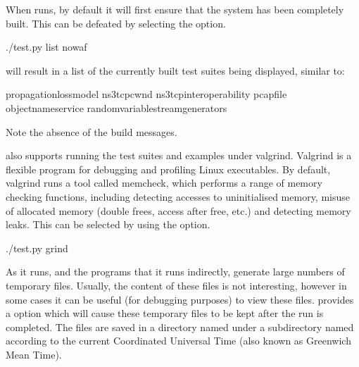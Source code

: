 \documentclass[letterpaper,10pt,english]{sphinxmanual}
\renewcommand{\sphinxcode}[1]{\texttt{\small{#1}}}
\begin{document}
When \sphinxcode{} runs, by default it will first ensure that the system has
been completely built.  This can be defeated by selecting the \sphinxcode{}
option.

\begin{sphinxVerbatim}[commandchars=\\\{\}]
\PYGZdl{} ./test.py \PYGZhy{}\PYGZhy{}list \PYGZhy{}\PYGZhy{}nowaf
\end{sphinxVerbatim}

will result in a list of the currently built test suites being displayed, similar to:

\begin{sphinxVerbatim}[commandchars=\\\{\}]
propagation\PYGZhy{}loss\PYGZhy{}model
ns3\PYGZhy{}tcp\PYGZhy{}cwnd
ns3\PYGZhy{}tcp\PYGZhy{}interoperability
pcap\PYGZhy{}file
object\PYGZhy{}name\PYGZhy{}service
random\PYGZhy{}variable\PYGZhy{}stream\PYGZhy{}generators
\end{sphinxVerbatim}

Note the absence of the \sphinxcode{} build messages.

\sphinxcode{} also supports running the test suites and examples under valgrind.
Valgrind is a flexible program for debugging and profiling Linux executables.  By
default, valgrind runs a tool called memcheck, which performs a range of memory\sphinxhyphen{}
checking functions, including detecting accesses to uninitialised memory, misuse
of allocated memory (double frees, access after free, etc.) and detecting memory
leaks.  This can be selected by using the \sphinxcode{} option.

\begin{sphinxVerbatim}[commandchars=\\\{\}]
\PYGZdl{} ./test.py \PYGZhy{}\PYGZhy{}grind
\end{sphinxVerbatim}

As it runs, \sphinxcode{} and the programs that it runs indirectly, generate large
numbers of temporary files.  Usually, the content of these files is not interesting,
however in some cases it can be useful (for debugging purposes) to view these files.
\sphinxcode{} provides a \sphinxcode{} option which will cause these temporary
files to be kept after the run is completed.  The files are saved in a directory
named \sphinxcode{} under a subdirectory named according to the current Coordinated
Universal Time (also known as Greenwich Mean Time).
\end{document}
